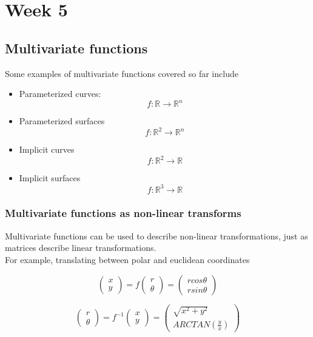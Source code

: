 \chapter{Week 5}

\section{Multivariate functions}

Some examples of multivariate functions covered so far include
\begin{itemize}
   \item Parameterized curves: \[
     f: \mathbb{R} \to \mathbb{R}^n
   \] 
   \item Parameterized surfaces \[
     f: \mathbb{R}^2 \to \mathbb{R}^n
   \] 
   \item Implicit curves \[
     f: \mathbb{R}^2 \to \mathbb{R}
      \] 
   \item Implicit surfaces
      \[
        f: \mathbb{R}^3 \to \mathbb{R}
      \]  
\end{itemize}

\subsection{Multivariate functions as non-linear transforms}

Multivariate functions can be used to describe non-linear transformations, just as matrices describe linear transformations. \\

For example, translating between polar and euclidean coordinates

\[
   \begin{pmatrix} 
     x \\ y  
   \end{pmatrix} = f \begin{pmatrix} r \\ \theta \end{pmatrix}  = \begin{pmatrix} r cos \theta \\ r sin \theta \end{pmatrix} 
\] 
  

\[
   \begin{pmatrix} r \\ \theta \end{pmatrix}= f^{-1} \begin{pmatrix} x \\ y \end{pmatrix}   = \begin{pmatrix} \sqrt{x^2 + y^2} \\ ARCTAN( \frac{y}{x}) \end{pmatrix} 
\] 

